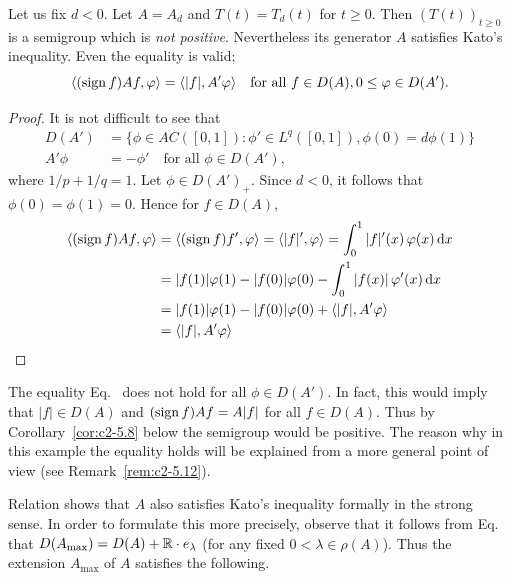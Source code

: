 Let us fix $d < 0$. Let $A = A_{d}$ and $T(t) = T_{d}(t)$ for $t \geq 0$. Then
$(T(t))_{t \geq 0}$ is a semigroup which is \emph{not positive}. Nevertheless its generator $A$ satisfies Kato's inequality. Even the equality is valid;
\ie
\begin{equation}\label{eq:c2-3.10}
\langle(\sign  f) Af,\phi\rangle = \langle|f|,A'\phi \rangle \quad \text{for all } f \in D(A), 0 \leq \phi \in D(A'). 
\end{equation}
\begin{proof}
It is not difficult to see that
\begin{equation}\label{eq:c2-3.11}
\begin{aligned}
D(A') &= \{\phi \in AC([0,1]) \colon \phi' \in L^{q}([0,1]), \phi(0) = d\phi(1)\}\\ 
A'\phi &= -\phi' \quad \text{for all } \phi \in D(A'),
\end{aligned}
\end{equation}
where $1/p + 1/q = 1$. Let $\phi \in D(A')_{+}$. 
Since $d < 0$, it follows that $\phi(0) = \phi(1) = 0$. 
Hence for $f \in D(A)$,
\begin{align*}
\langle(\sign  f)Af,\phi\rangle &= \langle(\sign  f)f',\phi\rangle = \langle|f|',\phi\rangle 
= \int_{0}^{1} |f|'(x) \, \phi(x) \dx\\
&= |f(1)|\phi(1) - |f(0)|\phi(0) - \int_{0}^{1} |f(x)| \, \phi'(x) \dx\\
&= |f(1)|\phi(1) - |f(0)|\phi(0) + \langle|f|,A'\phi\rangle\\
&= \langle|f|,A'\phi\rangle
\tag*{\qedsymbol}%
\end{align*}
\let\qedsymbol\relax
\end{proof}
\begin{remark}\label{rem:c2-3.15}
The equality Eq.~ does not hold for all $\phi \in D(A')$. 
In fact, this would imply that $|f| \in D(A)$ and $(\operatorname{sign}  f)Af = A|f|$ for
all $f \in D(A)$. 
Thus by Corollary~\ref{cor:c2-5.8}
below the semigroup would be positive. 
The reason why in this example the equality holds will be explained from a more general point of view 
(see Remark~\ref{rem:c2-5.12}).
\end{remark}
Relation  shows that $A$ also satisfies Kato's inequality
formally in the strong sense. 
In order to formulate this more precisely, observe that it follows from Eq.~ that $D(A_{\max}) = D(A) + \mathbb{R} \cdot e_{\lambda}$ (for any fixed $0 < \lambda \in \rho(A)$). Thus the extension $A_{\max}$ of\/ $A$ satisfies the following.
